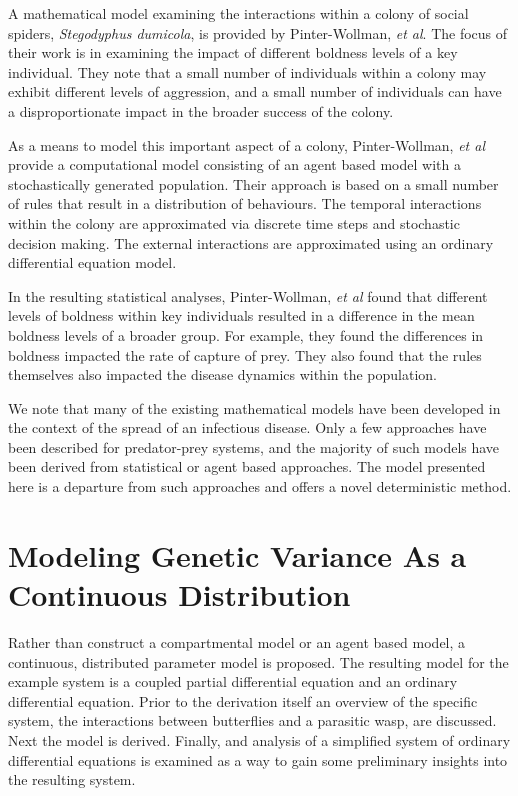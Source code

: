\documentclass[12pt]{article}
\begin{document}
A mathematical model examining the interactions within a colony of
social spiders, \textit{Stegodyphus dumicola}, is provided by
Pinter-Wollman, \textit{et al}\cite{doi:10.1086/687235}. The focus of
their work is in examining the impact of different boldness levels of
a key individual.  They note that a small number of individuals within
a colony may exhibit different levels of aggression, and a small
number of individuals can have a disproportionate impact in the
broader success of the colony.

As a means to model this important aspect of a colony, Pinter-Wollman,
\textit{et al}\cite{doi:10.1086/687235} provide a computational model
consisting of an agent based model with a stochastically generated
population. Their approach is based on a small number of rules that
result in a distribution of behaviours. The temporal interactions
within the colony are approximated via discrete time steps and
stochastic decision making. The external interactions are approximated
using an ordinary differential equation model.

In the resulting statistical analyses, Pinter-Wollman, \textit{et
  al}\cite{doi:10.1086/687235} found that different levels of boldness
within key individuals resulted in a difference in the mean boldness
levels of a broader group. For example, they found the differences in
boldness impacted the rate of capture of prey. They also found that
the rules themselves also impacted the disease dynamics within the
population.

We note that many of the existing mathematical models have been
developed in the context of the spread of an infectious disease. Only
a few approaches have been described for predator-prey systems, and
the majority of such models have been derived from statistical or
agent based approaches. The model presented here is a departure from
such approaches and offers a novel deterministic method.


\section{Modeling Genetic Variance As a Continuous Distribution}

Rather than construct a compartmental model or an agent based model, a
continuous, distributed parameter model is proposed. The resulting
model for the example system is a coupled partial differential
equation and an ordinary differential equation. Prior to the
derivation itself an overview of the specific system, the interactions
between butterflies and a parasitic wasp, are discussed. Next the
model is derived. Finally, and analysis of a simplified system of
ordinary differential equations is examined as a way to gain some
preliminary insights into the resulting system.
\end{document}
